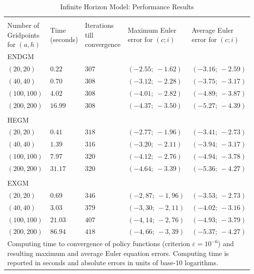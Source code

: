 \documentclass[a4paper,12pt]{article}%
\begin{document}
\begin{table}[htb] \centering
\caption{Infinite Horizon Model: Performance Results}
\begin{tabular}
[c]{p{4cm}||p{1.9cm}|p{2cm}|p{3.0cm}|p{3.0cm}}
\multicolumn{5}{p{14cm}}{} \\
Number of Gridpoints for $(a,h)$ & Time (seconds) & Iterations till convergence & Maximum Euler error for $\left( c;i \right)$ & Average Euler error for $\left( c;i \right)$ \\ \hline
ENDGM &  &  &  & \\
$\left( 20,20 \right)$ & $0.22$ & $307$ & $(-2.55;\ -1.62)$ & $(-3.16;\ -2.59)$ \\
$\left( 40,40 \right)$ & $0.70$ & $308$ & $(-3.12;\ -2.28)$ & $(-3.75;\ -3.17)$ \\
$\left( 100,100 \right)$ & $4.02$ & $308$ & $(-4.01;\ -2.82)$ & $(-4.89;\ -3.87)$ \\
$\left( 200,200 \right)$ & $16.99$ & $308$ & $(-4.37;\ -3.50)$ & $(-5.27;\ -4.39)$ \\
&  &  &  & \\ \hline
HEGM &  &  &  & \\
$\left( 20,20 \right)$ & $0.41$ & $318$ & $(-2.77;\ -1.96)$ & $(-3.41;\ -2.73)$ \\
$\left( 40,40 \right)$ & $1.39$ & $316$ & $(-3.20;\ -2.11)$ & $(-3.94;\ -3.17)$ \\
$\left( 100,100 \right)$ & $7.97$ & $320$ & $(-4.12;\ -2.76)$ & $(-4.94;\ -3.78)$ \\
$\left( 200,200 \right)$ & $31.17$ & $320$ & $(-4.64;\ -3.39)$ & $(-5.36;\ -4.27)$ \\
&  &  &  & \\ \hline
EXGM &  &  &  & \\
$\left( 20,20 \right)$ & $0.69$ & $346$ & $(-2,87;\ -1,96)$ & $(-3.53;\ -2.73)$ \\
$\left( 40,40 \right)$ & $3.03$ & $379$ & $(-3,30;\ -2,11)$ & $(-4.02;\ -3.16)$ \\
$\left( 100,100 \right)$ & $21.03$ & $407$ & $(-4,14;\ -2,76)$ & $(-4.93;\ -3.79)$ \\
$\left( 200,200 \right)$ & $86.94$ & $418$ & $(-4,66;\ -3,39)$ & $(-5.37;\ -4.27)$ \\ \hline
\multicolumn{5}{p{15cm}}{{\footnotesize Computing time to convergence of policy functions (criterion $\varepsilon=10^{-6}$) and resulting maximum and average Euler equation errors. Computing time is reported in seconds and absolute errors in units of base-10 logarithms.}}
\end{tabular}
\label{results_infinte}
\end{table}
\end{document}
